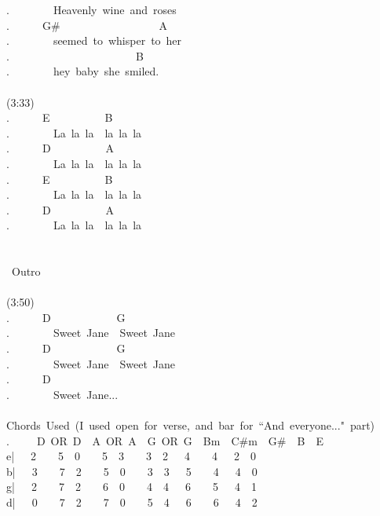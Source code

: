 {.\ \ \ \ \ \ \ \ Heavenly\ wine\ and\ roses\\
.\ \ \ \ \ \ G\#\ \ \ \ \ \ \ \ \ \ \ \ \ \ \ \ \ \ A\\
.\ \ \ \ \ \ \ \ seemed\ to\ whisper\ to\ her\\
.\ \ \ \ \ \ \ \ \ \ \ \ \ \ \ \ \ \ \ \ \ \ \ B\\
.\ \ \ \ \ \ \ \ hey\ baby\ she\ smiled.\\
\\
(3:33)\\
.\ \ \ \ \ \ E\ \ \ \ \ \ \ \ \ \ B\\
.\ \ \ \ \ \ \ \ La\ la\ la\ \ la\ la\ la\\
.\ \ \ \ \ \ D\ \ \ \ \ \ \ \ \ \ A\\
.\ \ \ \ \ \ \ \ La\ la\ la\ \ la\ la\ la\\
.\ \ \ \ \ \ E\ \ \ \ \ \ \ \ \ \ B\\
.\ \ \ \ \ \ \ \ La\ la\ la\ \ la\ la\ la\\
.\ \ \ \ \ \ D\ \ \ \ \ \ \ \ \ \ A\\
.\ \ \ \ \ \ \ \ La\ la\ la\ \ la\ la\ la\\
\\
\\
\lbrack\ Outro\rbrack\\
\\
(3:50)\\
.\ \ \ \ \ \ D\ \ \ \ \ \ \ \ \ \ \ \ G\ \ \ \ \ \ \ \ \ \ \\
.\ \ \ \ \ \ \ \ Sweet\ Jane\ \ Sweet\ Jane\\
.\ \ \ \ \ \ D\ \ \ \ \ \ \ \ \ \ \ \ G\ \ \\
.\ \ \ \ \ \ \ \ Sweet\ Jane\ \ Sweet\ Jane\\
.\ \ \ \ \ \ D\\
.\ \ \ \ \ \ \ \ Sweet\ Jane...\\
\\
Chords\ Used\ (I\ used\ open\ for\ verse,\ and\ bar\ for\ ``And\ everyone..."\ part)\\
.\ \ \ \ \ D\ OR\ D\ \ A\ OR\ A\ \ G\ OR\ G\ \ Bm\ \ C\#m\ \ G\#\ \ B\ \ E\ \ \\
e|\ \ \ 2\ \ \ \ 5\ \ 0\ \ \ \ 5\ \ 3\ \ \ \ 3\ \ 2\ \ \ 4\ \ \ \ 4\ \ \ 2\ \ 0\\
b|\ \ \ 3\ \ \ \ 7\ \ 2\ \ \ \ 5\ \ 0\ \ \ \ 3\ \ 3\ \ \ 5\ \ \ \ 4\ \ \ 4\ \ 0\\
g|\ \ \ 2\ \ \ \ 7\ \ 2\ \ \ \ 6\ \ 0\ \ \ \ 4\ \ 4\ \ \ 6\ \ \ \ 5\ \ \ 4\ \ 1\\
d|\ \ \ 0\ \ \ \ 7\ \ 2\ \ \ \ 7\ \ 0\ \ \ \ 5\ \ 4\ \ \ 6\ \ \ \ 6\ \ \ 4\ \ 2\\
}

